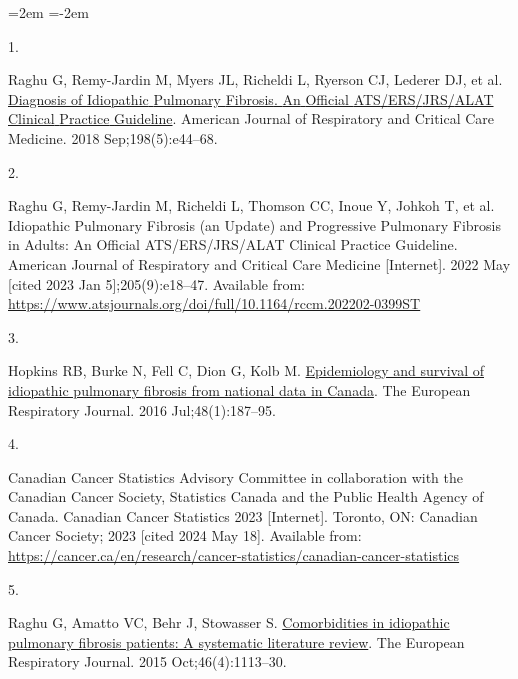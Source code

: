 \documentclass[
]{article}
\newlength{\cslhangindent}
\newlength{\csllabelwidth}
\newenvironment{CSLReferences}[2] %
 {\begin{list}{}{%
  \setlength{\itemindent}{0pt}
  \setlength{\leftmargin}{0pt}
  \setlength{\parsep}{0pt}
  \ifodd #1
   \setlength{\leftmargin}{\cslhangindent}
   \setlength{\itemindent}{-1\cslhangindent}
  \fi
  \setlength{\itemsep}{#2\baselineskip}}}
 {\end{list}}
\newcommand{\CSLLeftMargin}[1]{\parbox[t]{\csllabelwidth}{\strut#1\strut}}
\newcommand{\CSLRightInline}[1]{\parbox[t]{\linewidth - \csllabelwidth}{\strut#1\strut}}
\begin{document}
\noindent
\leftskip=2em
\parindent=-2em

\label{refs}
\begin{CSLReferences}{0}{1}
\CSLLeftMargin{1. }%
\CSLRightInline{Raghu G, Remy-Jardin M, Myers JL, Richeldi L, Ryerson CJ, Lederer DJ, et al. \href{https://doi.org/10.1164/rccm.201807-1255ST}{Diagnosis of {Idiopathic} {Pulmonary} {Fibrosis}. {An} {Official} {ATS}/{ERS}/{JRS}/{ALAT} {Clinical} {Practice} {Guideline}}. American Journal of Respiratory and Critical Care Medicine. 2018 Sep;198(5):e44--68. }

\CSLLeftMargin{2. }%
\CSLRightInline{Raghu G, Remy-Jardin M, Richeldi L, Thomson CC, Inoue Y, Johkoh T, et al. Idiopathic {Pulmonary} {Fibrosis} (an {Update}) and {Progressive} {Pulmonary} {Fibrosis} in {Adults}: {An} {Official} {ATS}/{ERS}/{JRS}/{ALAT} {Clinical} {Practice} {Guideline}. American Journal of Respiratory and Critical Care Medicine {[}Internet{]}. 2022 May {[}cited 2023 Jan 5{]};205(9):e18--47. Available from: \url{https://www.atsjournals.org/doi/full/10.1164/rccm.202202-0399ST}}

\CSLLeftMargin{3. }%
\CSLRightInline{Hopkins RB, Burke N, Fell C, Dion G, Kolb M. \href{https://doi.org/10.1183/13993003.01504-2015}{Epidemiology and survival of idiopathic pulmonary fibrosis from national data in {Canada}}. The European Respiratory Journal. 2016 Jul;48(1):187--95. }

\CSLLeftMargin{4. }%
\CSLRightInline{Canadian Cancer Statistics Advisory Committee in collaboration with the Canadian Cancer Society, Statistics Canada and the Public Health Agency of Canada. Canadian {Cancer} {Statistics} 2023 {[}Internet{]}. Toronto, ON: Canadian Cancer Society; 2023 {[}cited 2024 May 18{]}. Available from: \url{https://cancer.ca/en/research/cancer-statistics/canadian-cancer-statistics}}

\CSLLeftMargin{5. }%
\CSLRightInline{Raghu G, Amatto VC, Behr J, Stowasser S. \href{https://doi.org/10.1183/13993003.02316-2014}{Comorbidities in idiopathic pulmonary fibrosis patients: A systematic literature review}. The European Respiratory Journal. 2015 Oct;46(4):1113--30. }


\end{CSLReferences}
\end{document}
